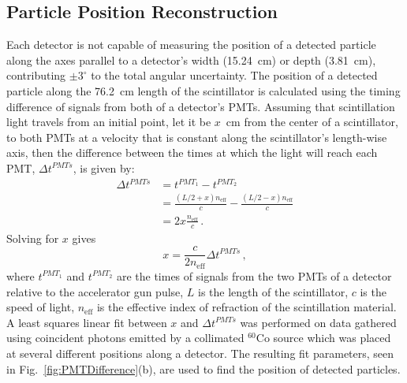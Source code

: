 \subsection{Particle Position Reconstruction}
Each detector is not capable of measuring the position of a detected particle along the axes parallel to a detector's width (15.24~cm) or depth (3.81~cm), contributing $\pm3^{\circ}$ to the total angular uncertainty.
The position of a detected particle along the 76.2~cm length of the scintillator is calculated using the timing difference of signals from both of a detector's PMTs.
Assuming that scintillation light travels from an initial point, let it be $x$~cm from the center of a scintillator, to both PMTs at a velocity that is constant along the scintillator's length-wise axis, then the difference between the times at which the light will reach each PMT, $\Delta t^{PMTs}$, is given by:
\begin{equation}
\begin{split}
\Delta t^{PMTs} & = t^{PMT_1}-t^{PMT_2} \\ 
& = \frac{(L/2 + x) n_{\text{eff}}}{c} - \frac{(L/2-x) n_{\text{eff}}}{c} \\
& = 2x \frac{n_{\text{eff}}}{c}  \, .
\end{split}
\end{equation}
Solving for $x$ gives 
\begin{equation}
\label{eq:position}
x = \frac{c}{2n_{\text{eff}}} \Delta t^{PMTs} \, ,
\end{equation}
where $t^{PMT_{1}}$ and $t^{PMT_{2}}$ are the times of signals from the two PMTs of a detector relative to the accelerator gun pulse, $L$ is the length of the scintillator, $c$ is the speed of light, $n_{\text{eff}}$ is the effective index of refraction of the scintillation material.
A least squares linear fit between $x$ and $\Delta t^{PMTs}$ was performed on data gathered using coincident photons emitted by a collimated $^{60}$Co source which was placed at several different positions along a detector.
The resulting fit parameters, seen in Fig.~\ref{fig:PMTDifference}(b), are used to find the position of detected particles.

